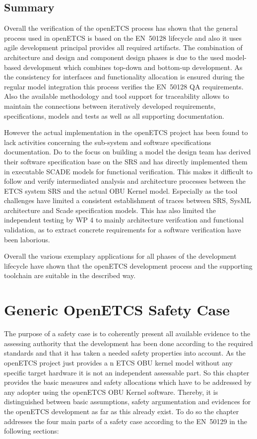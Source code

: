 \documentclass{template/openetcs_report}
\begin{document}
\section{Summary}
\label{summary-process}

Overall the verification of the openETCS process has shown that the general process used in openETCS is based on the EN~50128 lifecycle and also it uses agile development principal provides all required artifacts. The combination of architecture and design and component design phases is due to the used model-based development which combines top-down and bottom-up development. As the consistency for interfaces and functionality allocation is ensured during the regular model integration this process verifies the EN~50128 QA requirements. Also the available methodology and tool support for traceability allows to maintain the connections between iteratively developed requirements, specifications, models and tests as well as all supporting documentation.

However the actual implementation in the openETCS project has been found to lack activities concerning  the sub-system and software specifications documentation. Do to the focus on building a model the design team has derived their software specification base on the SRS and has directly implemented them in executable SCADE models for functional verification. This makes it difficult to follow and verify intermediated analysis and architecture processes between the ETCS system SRS and the actual OBU Kernel model. Especially as the tool challenges have limited a consistent establishment of traces between SRS, SysML architecture and Scade specification models. This has also limited the independent testing by WP 4 to mainly architecture verifcation and functional validation, as to extract concrete requirements for a software verification have been laborious. 

Overall the various exemplary applications for all phases of the development lifecycle have shown that the openETCS development process and the supporting toolchain are suitable in the described way. 


\chapter{Generic OpenETCS Safety Case}
\label{sec:hazardandrisk}

The purpose of a safety case is to coherently present all available evidence to the assessing authority that the development has been done according to the required standards and that it has taken a needed safety properties into account. As the openETCS project just provides a n ETCS OBU kernel model without any specific target hardware it is not an independent assessable part. So this chapter provides the basic measures and safety allocations which have to be addressed by any adopter using the openETCS OBU Kernel software. Thereby, it is distinguished between basic assumptions, safety argumentation and evidences for the openETCS development as far as this already exist. To do so the chapter addresses the four main parts of a safety case according to the EN~50129 in the following sections:
\end{document}
